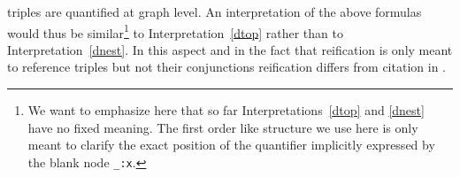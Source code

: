 triples are quantified at graph level. 
An interpretation of the above formulas would thus be similar\footnote{We want to emphasize here that so far Interpretations~\ref{dtop} and \ref{dnest} have no fixed meaning. 
The first order like structure we use here is only meant to clarify the exact position of the quantifier implicitly expressed by the blank node \texttt{\_:x}.} to Interpretation~\ref{dtop} rather than to Interpretation~\ref{dnest}.
%
 In this aspect  and in the fact that reification is only meant to reference triples but not their conjunctions 
 \rdf reification differs from citation in \nthree.

